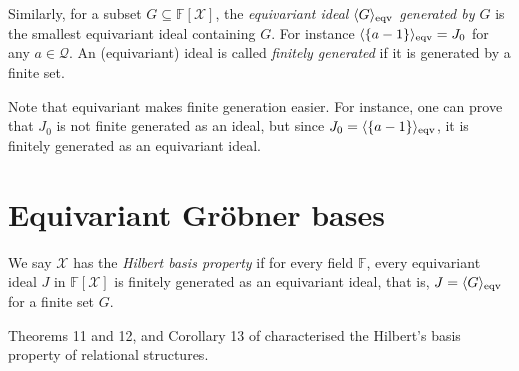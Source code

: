 \documentclass[12pt,a4paper,article]{memoir}
\newcommand{\struct}{\mathcal{X}}
\newcommand{\dloQ}{\mathcal{Q}}
\newcommand{\F}{\mathbb{F}}
\newcommand{\poly}[2]{#1[#2]}
\newcommand{\eqIdGen}[1]{\langle#1\rangle_{\textnormal{eqv}}}
\newcommand{\arka}[1]{}
\newcommand{\emphdef}[1]{\emph{\textcolor{BrickRed}{#1}}}
\theoremstyle{definition}
\begin{document}
Similarly, for a subset $G\subseteq\poly{\F}{\struct}$,
the \emphdef{equivariant ideal $\eqIdGen{G}$ generated by $G$} is the smallest equivariant ideal containing $G$.
For instance $\eqIdGen{\{a - 1\}} = J_0$ for any $a\in\dloQ$.
%
An (equivariant) ideal is called \emphdef{finitely generated} if it is generated by a finite set.

Note that equivariant makes finite generation easier.
For instance, one can prove that $J_0$ is not finite generated as an ideal,
but since $J_0 = \eqIdGen{\{a - 1\}}$,
it is finitely generated as an equivariant ideal.
%
\section{Equivariant Gröbner bases}
%
We say $\struct$ has the \emphdef{Hilbert basis property} if for every field $\F$, every equivariant ideal $J$ in $\poly{\F}{\struct}$ is finitely generated as an equivariant ideal, that is, $J = \eqIdGen{G}$ for a finite set $G$.

Theorems 11 and 12, and Corollary 13 of \cite{GL24} characterised the Hilbert's basis property of relational structures.

\arka{TODO:expand starting from this part}
\end{document}
